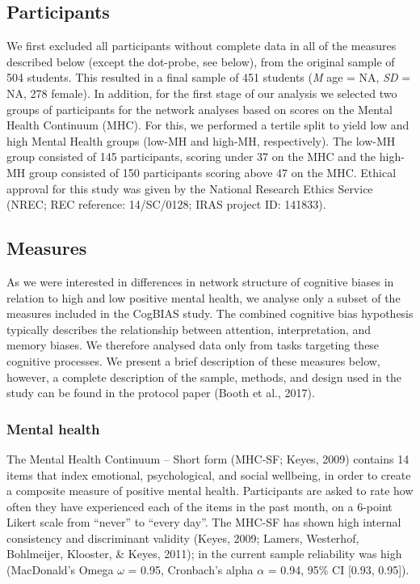 \documentclass[man,floatsintext]{apa6}
\begin{document}
\hypertarget{participants}{%
\subsection{Participants}\label{participants}}

We first excluded all participants without complete data in all of the measures described below (except the dot-probe, see below), from the original sample of 504 students. This resulted in a final sample of 451 students (\emph{M} age = NA, \emph{SD} = NA, 278 female). In addition, for the first stage of our analysis we selected two groups of participants for the network analyses based on scores on the Mental Health Continuum (MHC). For this, we performed a tertile split to yield low and high Mental Health groups (low-MH and high-MH, respectively). The low-MH group consisted of 145 participants, scoring under 37 on the MHC and the high-MH group consisted of 150 participants scoring above 47 on the MHC. Ethical approval for this study was given by the National Research Ethics Service (NREC; REC reference: 14/SC/0128; IRAS project ID: 141833).

\hypertarget{measures}{%
\subsection{Measures}\label{measures}}

As we were interested in differences in network structure of cognitive biases in relation to high and low positive mental health, we analyse only a subset of the measures included in the CogBIAS study. The combined cognitive bias hypothesis typically describes the relationship between attention, interpretation, and memory biases. We therefore analysed data only from tasks targeting these cognitive processes. We present a brief description of these measures below, however, a complete description of the sample, methods, and design used in the study can be found in the protocol paper (Booth et al., 2017).

\hypertarget{mental-health}{%
\subsubsection{Mental health}\label{mental-health}}

The Mental Health Continuum -- Short form (MHC-SF; Keyes, 2009) contains 14 items that index emotional, psychological, and social wellbeing, in order to create a composite measure of positive mental health. Participants are asked to rate how often they have experienced each of the items in the past month, on a 6-point Likert scale from \enquote{never} to \enquote{every day}. The MHC-SF has shown high internal consistency and discriminant validity (Keyes, 2009; Lamers, Westerhof, Bohlmeijer, Klooster, \& Keyes, 2011); in the current sample reliability was high (MacDonald's Omega \(\omega\) = 0.95, Cronbach's alpha \(\alpha\) = 0.94, 95\% CI {[}0.93, 0.95{]}).
\end{document}
